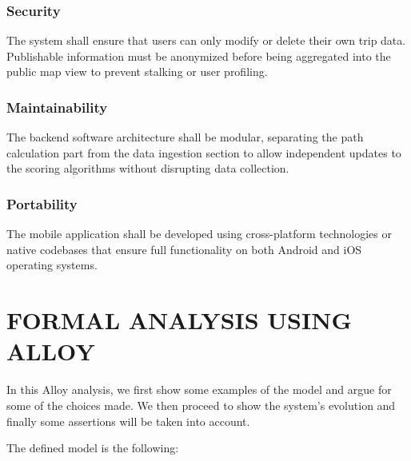 \documentclass{article}
\begin{document}
\subsubsection{Security}
The system shall ensure that users can only modify or delete their own trip data. Publishable information must be anonymized before being aggregated into the public map view to prevent stalking or user profiling.
\subsubsection{Maintainability}
The backend software architecture shall be modular, separating the path calculation part from the data ingestion section to allow independent updates to the scoring algorithms without disrupting data collection.
\subsubsection{Portability}
The mobile application shall be developed using cross-platform technologies or native codebases that ensure full functionality on both Android and iOS operating systems.



\section{FORMAL ANALYSIS USING ALLOY}
In this Alloy analysis, we first show some examples of the model and argue for some of the choices made. We then proceed to show the system's evolution and finally some assertions will be taken into account.

\vspace{0.5cm}

\noindent The defined model is the following: 
\end{document}
